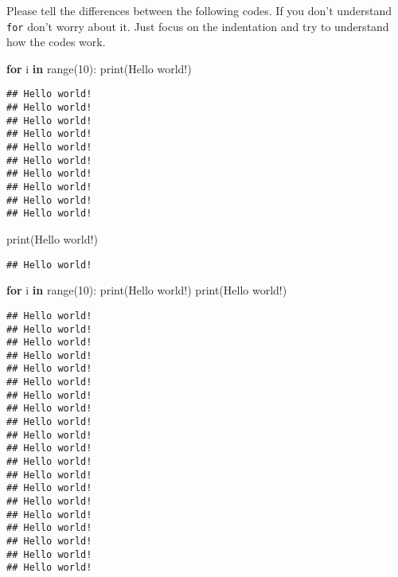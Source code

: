 \documentclass[
]{book}
\newenvironment{Shaded}{\begin{snugshade}}{\end{snugshade}}
\newcommand{\BuiltInTok}[1]{#1}
\newcommand{\ControlFlowTok}[1]{\textcolor[rgb]{0.13,0.29,0.53}{\textbf{#1}}}
\newcommand{\DecValTok}[1]{\textcolor[rgb]{0.00,0.00,0.81}{#1}}
\newcommand{\KeywordTok}[1]{\textcolor[rgb]{0.13,0.29,0.53}{\textbf{#1}}}
\newcommand{\NormalTok}[1]{#1}
\newcommand{\StringTok}[1]{\textcolor[rgb]{0.31,0.60,0.02}{#1}}
\begin{document}
Please tell the differences between the following codes. If you don't understand \texttt{for} don't worry about it. Just focus on the indentation and try to understand how the codes work.

\begin{Shaded}
\begin{Highlighting}[]
\ControlFlowTok{for}\NormalTok{ i }\KeywordTok{in} \BuiltInTok{range}\NormalTok{(}\DecValTok{10}\NormalTok{):}
    \BuiltInTok{print}\NormalTok{(}\StringTok{\textquotesingle{}Hello world!\textquotesingle{}}\NormalTok{)}
\end{Highlighting}
\end{Shaded}

\begin{verbatim}
## Hello world!
## Hello world!
## Hello world!
## Hello world!
## Hello world!
## Hello world!
## Hello world!
## Hello world!
## Hello world!
## Hello world!
\end{verbatim}

\begin{Shaded}
\begin{Highlighting}[]
\BuiltInTok{print}\NormalTok{(}\StringTok{\textquotesingle{}Hello world!\textquotesingle{}}\NormalTok{)}
\end{Highlighting}
\end{Shaded}

\begin{verbatim}
## Hello world!
\end{verbatim}

\begin{Shaded}
\begin{Highlighting}[]
\ControlFlowTok{for}\NormalTok{ i }\KeywordTok{in} \BuiltInTok{range}\NormalTok{(}\DecValTok{10}\NormalTok{):}
    \BuiltInTok{print}\NormalTok{(}\StringTok{\textquotesingle{}Hello world!\textquotesingle{}}\NormalTok{)}
    \BuiltInTok{print}\NormalTok{(}\StringTok{\textquotesingle{}Hello world!\textquotesingle{}}\NormalTok{)}
\end{Highlighting}
\end{Shaded}

\begin{verbatim}
## Hello world!
## Hello world!
## Hello world!
## Hello world!
## Hello world!
## Hello world!
## Hello world!
## Hello world!
## Hello world!
## Hello world!
## Hello world!
## Hello world!
## Hello world!
## Hello world!
## Hello world!
## Hello world!
## Hello world!
## Hello world!
## Hello world!
## Hello world!
\end{verbatim}
\end{document}
